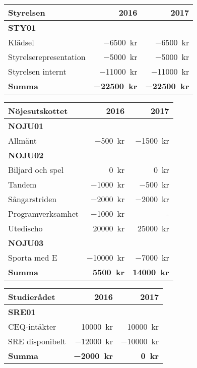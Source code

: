 \documentclass[../_main/handlingar.tex]{subfiles}
\begin{document}
\begin{tabularx}{10cm}{X r r}
    \textbf{\large Styrelsen} & \textbf{2016} & \textbf{2017} \\
    \hline
    \textbf{STY01} \\
    Klädsel & \SI{-6500}{kr} & \SI{-6500}{kr} \\
    Styrelserepresentation & \SI{-5000}{kr} & \SI{-5000}{kr} \\
    Styrelsen internt & \SI{-11000}{kr} & \SI{-11000}{kr} \\
    \hline
    \textbf{Summa} & \textbf{\SI{-22500}{kr}} & \textbf{\SI{-22500}{kr}} \\
\end{tabularx}

\begin{tabularx}{10cm}{X r r}
    \textbf{\large Nöjesutskottet} & \textbf{2016} & \textbf{2017} \\
    \hline
    \textbf{NOJU01} \\
    Allmänt & \SI{-500}{kr} & \SI{-1500}{kr} \\
    \textbf{NOJU02} \\
    Biljard och spel & \SI{0}{kr} & \SI{0}{kr} \\
    Tandem & \SI{-1000}{kr} & \SI{-500}{kr} \\
    Sångarstriden & \SI{-2000}{kr} & \SI{-2000}{kr} \\
    Programverksamhet & \SI{-1000}{kr} & - \\
    Utedischo & \SI{20000}{kr} & \SI{25000}{kr} \\
    \textbf{NOJU03} \\
    Sporta med E & \SI{-10000}{kr} & \SI{-7000}{kr} \\
    \hline
    \textbf{Summa} & \textbf{\SI{5500}{kr}} & \textbf{\SI{14000}{kr}} \\
\end{tabularx}

\begin{tabularx}{10cm}{X r r}
    \textbf{\large Studierådet} & \textbf{2016} & \textbf{2017} \\
    \hline
    \textbf{SRE01} \\
    CEQ-intäkter & \SI{10000}{kr} & \SI{10000}{kr} \\
    SRE disponibelt & \SI{-12000}{kr} & \SI{-10000}{kr} \\
    \hline
    \textbf{Summa} & \textbf{\SI{-2000}{kr}} & \textbf{\SI{0}{kr}} \\
\end{tabularx}
\end{document}
